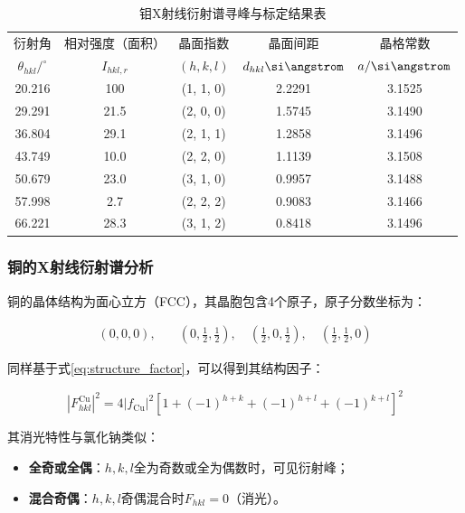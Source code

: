 \documentclass{thuemp}
\begin{document}
\begin{table}
    \centering
    \captionnamefont{\wuhao\bf\heiti}
    \captiontitlefont{\wuhao\bf\heiti}
    \caption{钼X射线衍射谱寻峰与标定结果表}
    \label{tab:mo_xrd}
    \liuhao
    \begin{tabular}{ccccc}
        \toprule
        衍射角 & 相对强度（面积）& 晶面指数 & 晶面间距 & 晶格常数 \\
        $\theta_{hkl}/^\circ$ & $I_{hkl,r}$ & $(h,k,l)$ & $d_{hkl}\text{\si\angstrom}$ & $a/\text{\si\angstrom}$\\
        \midrule
        20.216 &  100 & (1, 1, 0) & 2.2291 & 3.1525 \\
        29.291 & 21.5 & (2, 0, 0) & 1.5745 & 3.1490 \\
        36.804 & 29.1 & (2, 1, 1) & 1.2858 & 3.1496 \\
        43.749 & 10.0 & (2, 2, 0) & 1.1139 & 3.1508 \\
        50.679 & 23.0 & (3, 1, 0) & 0.9957 & 3.1488 \\
        57.998 &  2.7 & (2, 2, 2) & 0.9083 & 3.1466 \\
        66.221 & 28.3 & (3, 1, 2) & 0.8418 & 3.1496 \\
        \bottomrule
    \end{tabular}
\end{table}

\subsubsection{铜的X射线衍射谱分析}

铜的晶体结构为面心立方（FCC），其晶胞包含4个原子，原子分数坐标为：

\begin{align*}
(0,0,0),\quad &\left(0,\frac{1}{2},\frac{1}{2}\right),\quad \left(\frac{1}{2},0,\frac{1}{2}\right),\quad \left(\frac{1}{2},\frac{1}{2},0\right)
\end{align*}

同样基于式\ref{eq:structure_factor}，可以得到其结构因子：

\begin{equation}
    |F_{hkl}^{\text{Cu}}|^2 = 4|f_{\text{Cu}}|^2\left[1 + (-1)^{h+k} + (-1)^{h+l} + (-1)^{k+l}\right]^2
    \label{eq:cu_struct_fac}
\end{equation}

其消光特性与氯化钠类似：

\begin{itemize}
    \item \textbf{全奇或全偶}：$h,k,l$全为奇数或全为偶数时，可见衍射峰；
    \item \textbf{混合奇偶}：$h,k,l$奇偶混合时$F_{hkl}=0$（消光）。
\end{itemize}
\end{document}
